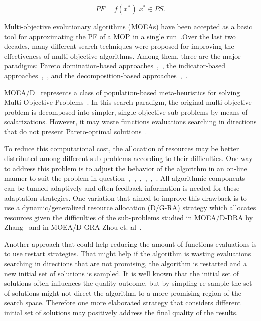 \begin{equation}
	PF = {f(x^*) | x^* \in PS }.
\end{equation}


Multi-objective evolutionary algorithms (MOEAs) have been accepted as a basic tool for approximating the PF of a MOP in a single run~\cite{zhou2011multiobjective}.Over the last two decades, many different search techniques were proposed for improving the effectiveness of multi-objective algorithms. Among them, three are the major paradigms: Pareto domination-based approaches~\cite{deb2002fast},~\cite{zitzler2001spea2}, the indicator-based approaches~\cite{beume2007sms},~\cite{zitzler2004indicator}, and the decomposition-based approaches~\cite{li2009multiobjective},~\cite{zhang2007moea}. 

MOEA/D~\cite{zhang2007moea} represents a class of population-based meta-heuristics for solving Multi Objective Problems~\cite{trivedi2017survey}. In this search paradigm, the original multi-objective problem is decomposed into simpler, single-objective sub-problems by means of scalarizations.
 However, it may waste functions evaluations searching in directions that do not present Pareto-optimal solutions~\cite{bezerra2015comparing}. 
 
 To reduce this computational cost, the allocation of resources may be better distributed among different sub-problems according to their difficulties. One way to address this problem is to adjust the behavior of the algorithm in an on-line manner to suit the problem in question~\cite{hinterding1997adaptation},~\cite{de2007parameter},~\cite{meyer2007self},~\cite{zhang2009performance},~\cite{kramer2010evolutionary},~\cite{zhang2012survey}. All algorithmic components can be tunned adaptively and often feedback information is needed for these adaptation strategies. One variation that aimed to improve this drawback is to use a dynamic/generalized resource allocation (D/G-RA) strategy which allocates resources given the difficulties of the sub-problems studied in MOEA/D-DRA by Zhang~\cite{zhang2009performance}  and  in MOEA/D-GRA Zhou et. al~\cite{zhou2016all}.
 
Another approach that could help reducing the amount of functions evaluations is to use restart strategies. That might help if the algorithm is wasting evaluations searching in directions that are not promising, the algorithm is restarted and a new initial set of solutions is sampled. It is well known that the initial set of solutions often influences the quality outcome, but by simpling re-sample the set of solutions might not direct the algorithm to a more promising region of the search space. Therefore one more elaborated strategy that considers different initial set of solutions may positively address the final quality of the results.
 
